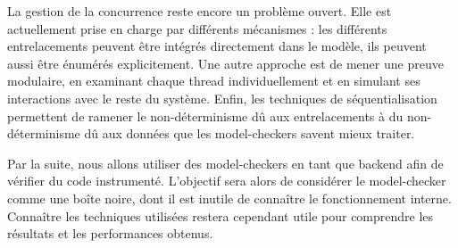 La gestion de la concurrence reste encore un problème ouvert.
Elle est actuellement prise en charge par différents mécanismes : les
différents entrelacements peuvent être intégrés directement dans le modèle, ils
peuvent aussi être énumérés explicitement. Une autre approche est de mener une
preuve modulaire, en examinant chaque thread individuellement et en simulant ses
interactions avec le reste du système. Enfin, les techniques de
séquentialisation permettent de ramener le non-déterminisme dû aux
entrelacements à du non-déterminisme dû aux données que les model-checkers
savent mieux traiter.

Par la suite, nous allons utiliser des model-checkers en tant que backend
afin de vérifier du code instrumenté. L'objectif sera alors de considérer le
model-checker comme une boîte noire, dont il est inutile de connaître le
fonctionnement interne. Connaître les techniques utilisées restera cependant
utile pour comprendre les résultats et les performances obtenus.